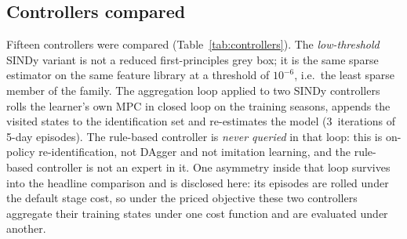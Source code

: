 \subsection{Controllers compared}
\label{sec:controllers}

Fifteen controllers were compared (Table~\ref{tab:controllers}). The
\emph{low-threshold} SINDy variant is not a reduced first-principles grey box; it is the
same sparse estimator on the same feature library at a threshold of $10^{-6}$, i.e.\ the
least sparse member of the family. The aggregation loop applied to two SINDy
controllers rolls the learner's own MPC in closed loop on the training seasons, appends
the visited states to the identification set and re-estimates the model (3~iterations of
5-day episodes). The rule-based controller is \emph{never queried} in that loop: this is
on-policy re-identification, not DAgger and not imitation learning, and the rule-based
controller is not an expert in it. One asymmetry inside that loop survives into the
headline comparison and is disclosed here: its episodes are rolled under the default stage
cost, so under the priced objective these two controllers aggregate their training states
under one cost function and are evaluated under another.

